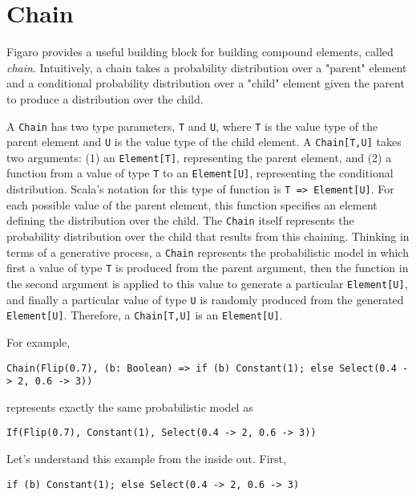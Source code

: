 \section{Chain}

Figaro provides a useful building block for building compound elements, called \emph{chain}. Intuitively, a chain takes a probability distribution over a "parent" element and a conditional probability distribution over a "child" element given the parent to produce a distribution over the child.

A \texttt{Chain} has two type parameters, \texttt{T} and \texttt{U}, where \texttt{T} is the value type of the parent element and \texttt{U} is the value type of the child element. A \texttt{Chain[T,U]} takes two arguments: (1) an \texttt{Element[T]}, representing the parent element, and (2) a function from a value of type \texttt{T} to an \texttt{Element[U]}, representing the conditional distribution. Scala's notation for this type of function is \texttt{T => Element[U]}. For each possible value of the parent element, this function specifies an element defining the distribution over the child. The \texttt{Chain} itself represents the probability distribution over the child that results from this chaining. Thinking in terms of a generative process, a \texttt{Chain} represents the probabilistic
model in which first a value of type \texttt{T} is produced from the parent argument, then the function in the second argument is applied to this value to generate a particular \texttt{Element[U]}, and finally a particular value of type \texttt{U} is randomly produced from the generated \texttt{Element[U]}. Therefore, a \texttt{Chain[T,U]} is an \texttt{Element[U]}.

For example,
\begin{flushleft}
\texttt{Chain(Flip(0.7), (b: Boolean) =>
\newline \tab if (b) Constant(1); else Select(0.4 -> 2, 0.6 -> 3))}
\end{flushleft}

represents exactly the same probabilistic model as

\begin{flushleft}
\texttt{If(Flip(0.7), Constant(1), Select(0.4 -> 2, 0.6 -> 3))}
\end{flushleft}

Let's understand this example from the inside out. First,

\begin{flushleft}
\texttt{if (b) Constant(1); else Select(0.4 -> 2, 0.6 -> 3)}
\end{flushleft}

